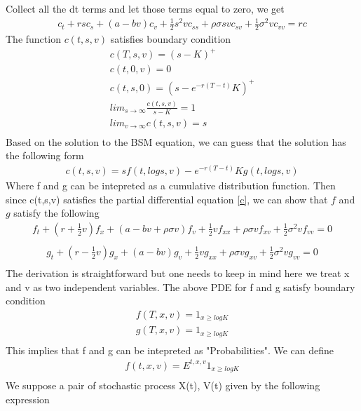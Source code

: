 \documentclass[a4paper]{article}
\begin{document}
Collect all the dt terms and let those terms equal to zero, we get
\begin{align}\label{c}
	c_t + rs c_s + (a-bv)c_v + \frac{1}{2} s^2 v c_{ss} + \rho \sigma svc_{sv}
	+\frac{1}{2} \sigma^2vc_{vv} = rc
\end{align}
The function $c(t, s, v)$ satisfies boundary condition
\begin{align*}
	c(T, s, v) = (s-K)^+ \\
	c(t, 0, v) = 0 \\
	c(t, s, 0) = (s - e^{-r(T-t)}K)^+\\
	lim_{s \to \infty} \frac{c(t, s, v)}{s-K} = 1 \\
	lim_{v \to \infty} c(t, s, v) = s\\  
\end{align*}
Based on the solution to the BSM equation, we can guess that the solution has the following form
\begin{align}
	c(t,s,v) = sf(t, logs, v) - e^{-r(T-t)}Kg(t,logs,v)
\end{align}	
Where f and g can be intepreted as a cumulative distribution function.
Then since c(t,s,v) satisfies the partial differential equation \ref{c}, we can show that $f$ and $g$ satisfy the following
\begin{align} \label{f}
	f_t + (r + \frac{1}{2}v)f_x + (a-bv+\rho \sigma v)f_v 
	+ \frac{1}{2}  v f_{xx} + \rho \sigma vf_{xv}
        +\frac{1}{2} \sigma^2 vf_{vv} = 0\\
\end{align}
\begin{align}
	g_t + (r - \frac{1}{2}v)g_x + (a-bv)g_v 
	+ \frac{1}{2}  v g_{xx} + \rho \sigma vg_{xv}
        +\frac{1}{2} \sigma^2 vg_{vv} = 0\\
\end{align}
The derivation is straightforward but one needs to keep in mind here we treat x and v as two independent variables. The above PDE for f and g satisfy boundary condition
\begin{align*}
	f(T, x, v) = 1_{x\geq logK}\\
	g(T, x, v) = 1_{x\geq logK}\\
\end{align*}
This implies that f and g can be intepreted as "Probabilities". We can define
\begin{align*}
	f(t, x, v) = E^{t,x,v}1_{x\geq logK}\\
\end{align*}
We suppose a pair of stochastic process X(t), V(t) given by the following expression
\end{document}
